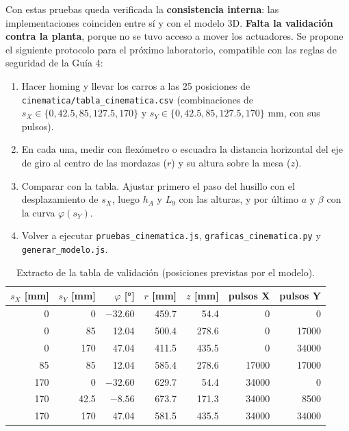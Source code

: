 \documentclass[a4paper,12pt]{article}
\newcommand{\codigo}[1]{\texttt{\small #1}}
\begin{document}
Con estas pruebas queda verificada la \textbf{consistencia interna}: las implementaciones coinciden entre
sí y con el modelo 3D. \textbf{Falta la validación contra la planta}, porque no se tuvo acceso a mover los
actuadores. Se propone el siguiente protocolo para el próximo laboratorio, compatible con las reglas de
seguridad de la Guía 4:
\begin{enumerate}
\item Hacer homing y llevar los carros a las 25 posiciones de \codigo{cinematica/tabla\_cinematica.csv}
      (combinaciones de $s_X \in \{0, 42.5, 85, 127.5, 170\}$ y $s_Y \in \{0, 42.5, 85, 127.5, 170\}$ mm, con sus pulsos).
\item En cada una, medir con flexómetro o escuadra la distancia horizontal del eje de giro al centro de las
      mordazas ($r$) y su altura sobre la mesa ($z$).
\item Comparar con la tabla. Ajustar primero el paso del husillo con el desplazamiento de $s_X$, luego $h_A$
      y $L_9$ con las alturas, y por último $a$ y $\beta$ con la curva $\varphi(s_Y)$.
\item Volver a ejecutar \codigo{pruebas\_cinematica.js}, \codigo{graficas\_cinematica.py} y
      \codigo{generar\_modelo.js}.
\end{enumerate}

\begin{table}[H]
\centering\small
\begin{tabular}{@{}rrrrrrr@{}}
\toprule
$s_X$ [mm] & $s_Y$ [mm] & $\varphi$ [°] & $r$ [mm] & $z$ [mm] & pulsos X & pulsos Y\\
\midrule
0 & 0 & $-32.60$ & 459.7 & 54.4 & 0 & 0\\
0 & 85 & 12.04 & 500.4 & 278.6 & 0 & 17000\\
0 & 170 & 47.04 & 411.5 & 435.5 & 0 & 34000\\
85 & 85 & 12.04 & 585.4 & 278.6 & 17000 & 17000\\
170 & 0 & $-32.60$ & 629.7 & 54.4 & 34000 & 0\\
170 & 42.5 & $-8.56$ & 673.7 & 171.3 & 34000 & 8500\\
170 & 170 & 47.04 & 581.5 & 435.5 & 34000 & 34000\\
\bottomrule
\end{tabular}
\caption{Extracto de la tabla de validación (posiciones previstas por el modelo).}
\end{table}

\end{document}
